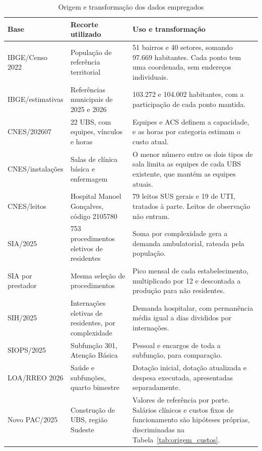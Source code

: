 \begin{table}[htbp]\centering
\caption{Origem e transformação dos dados empregados}\label{tab:rastreabilidade}
\begin{tabular}{p{.20\linewidth}p{.30\linewidth}p{.39\linewidth}}
\toprule Base & Recorte utilizado & Uso e transformação\\\midrule
IBGE/Censo 2022 \citep{ibge2022} & População de referência territorial & 51 bairros e 40 setores, somando 97.669 habitantes. Cada ponto tem uma coordenada, sem endereços individuais.\\
IBGE/estimativas \citep{ibge2025est,ibge2026est} & Referências municipais de 2025 e 2026 & 103.272 e 104.002 habitantes, com a participação de cada ponto mantida.\\
CNES/202607 \citep{cnes2026} & 22 UBS, com equipes, vínculos e horas & Equipes e ACS definem a capacidade, e as horas por categoria estimam o custo atual.\\
CNES/instalações \citep{cnes2026} & Salas de clínica básica e enfermagem & O menor número entre os dois tipos de sala limita as equipes de cada UBS existente, que mantém as equipes atuais.\\
CNES/leitos \citep{cnes2026} & Hospital Manoel Gonçalves, código 2105780 & 79 leitos SUS gerais e 19 de UTI, tratados à parte. Leitos de observação não entram.\\
SIA/2025 \citep{datasus2026,sigtap} & 753 procedimentos eletivos de residentes & Soma por complexidade gera a demanda ambulatorial, rateada pela população.\\
SIA por prestador \citep{datasus2026} & Mesma seleção de procedimentos & Pico mensal de cada estabelecimento, multiplicado por 12 e descontada a produção para não residentes.\\
SIH/2025 \citep{datasus2026} & Internações eletivas de residentes, por complexidade & Demanda hospitalar, com permanência média igual a dias divididos por internações.\\
SIOPS/2025 \citep{siops} & Subfunção 301, Atenção Básica & Pessoal e encargos de toda a subfunção, para comparação.\\
LOA/RREO 2026 \citep{itauna2025,tesouro2026} & Saúde e subfunções, quarto bimestre & Dotação inicial, dotação atualizada e despesa executada, apresentadas separadamente.\\
Novo PAC/2025 \citep{novopac2025} & Construção de UBS, região Sudeste & Valores de referência por porte. Salários clínicos e custos fixos de funcionamento são hipóteses próprias, discriminadas na Tabela~\ref{tab:origem_custos}.\\
\bottomrule\end{tabular}
\end{table}

